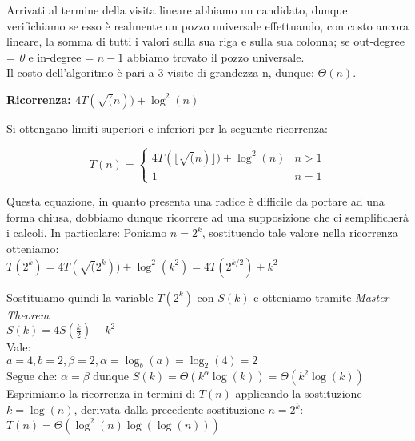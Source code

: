 \documentclass[../cheatSheetAlgoritmi.tex]{subfiles}
\begin{document}
Arrivati al termine della visita lineare abbiamo un candidato, dunque verifichiamo se esso è realmente un pozzo universale effettuando, con costo ancora lineare, la somma di tutti i valori sulla sua riga e sulla sua colonna; se out-degree = \textit{0} e in-degree = $n - 1$ abbiamo trovato il pozzo universale.\\
Il costo dell'algoritmo è pari a 3 visite di grandezza n, dunque: $\Theta(n)$.

\bigskip
\textbf{Ricorrenza: $4T(\sqrt(n)) + \log^2(n)$}

\bigskip
Si ottengano limiti superiori e inferiori per la seguente ricorrenza:
\begin{center}
	\begin{equation*}
  		T(n)=\begin{cases}
    		4T(\lfloor \sqrt(n) \rfloor) + \log^2(n)  & \text{$n > 1$}\\
    		1 & \text{$n = 1$}
  		\end{cases}
	\end{equation*}
\end{center}

\bigskip
Questa equazione, in quanto presenta una radice è difficile da portare ad una forma chiusa, dobbiamo dunque ricorrere ad una supposizione che ci semplificherà i calcoli. In particolare:
Poniamo $n = 2^k$, sostituendo tale valore nella ricorrenza otteniamo:\\
$T(2^k) = 4T(\sqrt(2^k)) + \log^{2}(k^2)= 4T(2^{k/2}) + k^2$

\bigskip
Sostituiamo quindi la variable $T(2^k)$ con $S(k)$ e otteniamo tramite \textit{Master Theorem}\\
$S(k) = 4S(\frac{k}{2}) +k^2$ \\
Vale:\\
$a = 4, b = 2, \beta = 2, \alpha = \log_b(a) = \log_2(4) = 2$\\
Segue che: $\alpha = \beta$ dunque $S(k) = \Theta(k^\alpha \log(k)) = \Theta(k^2 \log(k))$\\
Esprimiamo la ricorrenza in termini di $T(n)$ applicando la sostituzione $k = \log(n)$, derivata dalla precedente sostituzione $n = 2^k$:\\
$T(n) = \Theta(\log^2(n)\log(\log(n)))$

\newpage
\end{document}
